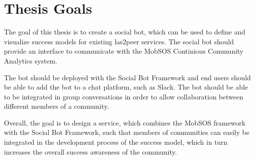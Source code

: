 \newpage

\section{Thesis Goals}

The goal of this thesis is to create a social bot, which can be used to define and visualize success models for existing las2peer services. The social bot should provide an interface to communicate with the MobSOS Continious Community Analytics system.

The bot should be deployed with the Social Bot Framework and end users should be able to add the bot to a chat platform, such as Slack. The bot should be able to be integrated in group conversations in order to allow collaboration between different members of a community.

Overall, the goal is to design a service, which combines the MobSOS framework with the Social Bot Framework, such that members of communities can easily be integrated in the development process of the success model, which in turn increases the overall success awareness of the community.

\blankpage
